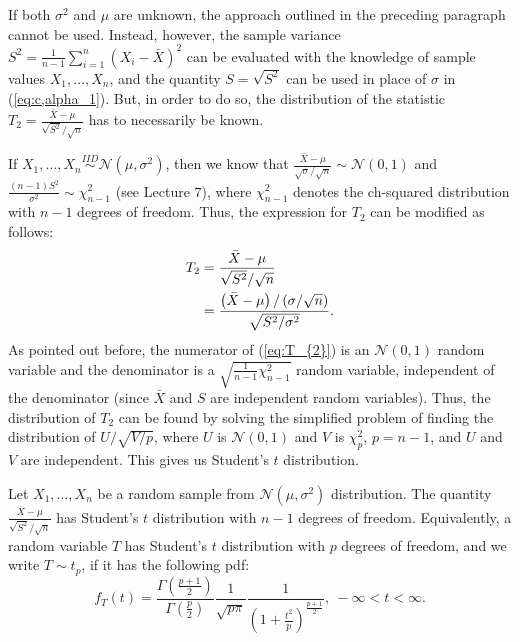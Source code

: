 \documentclass[a4paper,english,12pt]{article}
\begin{document}
\par If both $ \sigma^{2} $ and $ \mu $ are unknown, the approach outlined in the preceding paragraph cannot be used. Instead, however, the sample variance $ S^{2}=\frac{1}{n-1}\sum\limits_{i=1}^{n} \left(X_{i}-\bar{X}\right)^{2} $ can be evaluated with the knowledge of sample values $ X_{1},\ldots,X_{n} $, and the quantity $ S=\sqrt{S^{2}} $ can be used in place of $ \sigma $ in  (\ref*{eq:c,alpha_1}). But, in order to do so, the distribution of the statistic $ T_{2}=\frac{\bar{X}-\mu}{\sqrt{S^{2}}/\sqrt{n}} $ has to necessarily be known.
\par If $ X_{1},\ldots,X_{n}\stackrel{IID}{\sim} \mathcal{N}(\mu,\sigma^{2}) $, then we know that $ \frac{\bar{X}-\mu}{\sqrt{\sigma}/\sqrt{n}}\sim \mathcal{N}(0,1) $ and $ \frac{(n-1)S^{2}}{\sigma^{2}} \sim \chi_{n-1}^{2} $ (see Lecture $ 7 $), where $ \chi_{n-1}^{2} $ denotes the ch-squared distribution with $ n-1 $ degrees of freedom. Thus, the expression for $ T_{2} $ can be modified as follows:
\begin{align}
T_{2}&=\frac{\bar{X}-\mu}{\sqrt{S^{2}}/\sqrt{n}}\nonumber\\
     &=\frac{\left(\bar{X}-\mu\right)/\left(\sigma/\sqrt{n}\right)}{\sqrt{S^{2}/\sigma^2}}.\label{eq:T_{2}}
\end{align}
As pointed out before, the numerator of  (\ref*{eq:T_{2}}) is an $ \mathcal{N}(0,1) $ random variable and the denominator is a $ \sqrt{\frac{1}{n-1}\chi_{n-1}^{2}} $ random variable, independent of the denominator (since $ \bar{X} $ and $ S $ are independent random variables). Thus, the distribution of $ T_{2} $ can be found by solving the simplified problem of finding the distribution of $ U/\sqrt{V/p} $, where $ U $ is $ \mathcal{N}(0,1) $ and $ V $ is $ \chi_{p}^{2} $, $ p=n-1 $, and $ U $ and $ V $ are independent. This gives us Student's $ t $ distribution.
\begin{defn}
	Let $ X_{1},\ldots,X_{n} $ be a random sample from $ \mathcal{N}(\mu,\sigma^{2}) $ distribution. The quantity $ \frac{\bar{X}-\mu}{\sqrt{S^{2}}/\sqrt{n}} $ has Student's $ t $ distribution with $ n-1 $ degrees of freedom. Equivalently, a random variable $ T $ has Student's $ t $ distribution with $ p $ degrees of freedom, and we write $ T\sim t_{p} $, if it has the following pdf:
	\begin{equation}
	f_{T}(t)=\frac{\Gamma\left(\frac{p+1}{2}\right)}{\Gamma\left(\frac{p}{2}\right)} \frac{1}{\sqrt{p\pi}} \frac{1}{\left(1+\frac{t^{2}}{p}\right)^{\frac{p+1}{2}}},~-\infty < t < \infty.\label{eq:pdf_ST}
	\end{equation}
\end{defn}
\end{document}
